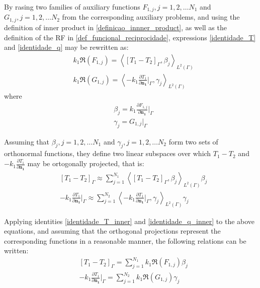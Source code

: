\documentclass[12pt]{CHT-20}
\begin{document}
By rasing two families of auxiliary functions $F_{1,j}, j=1,2,\ldots N_1$ and $G_{1,j}, j=1,2,\ldots N_2$ from the corresponding auxiliary problems, and using the definition of inner product in \eqref{definicao_innner_product}, as well as the definition of the RF in \eqref{def_funcional_reciprocidade}, expressions \eqref{identidade_T} and \eqref{identidade_q} may be rewritten as:
\begin{align}
& k_1 \Re(F_{1,j})
=
\left\langle \left[T_1 - T_2\right]_\Gamma, \beta_j\right\rangle _{L^2(\Gamma)}
\label{identidade_T_inner} \\
& k_1 \Re(G_{1,j})
=
\left\langle  -k_1 \frac{\partial T_1}{\partial\mathbf{n_1}}\bigg|_\Gamma, \gamma_j\right\rangle _{L^2(\Gamma)}
\label{identidade_q_inner}
\end{align}
where
\begin{align}
& \beta_j = k_1 \frac{\partial F_{1,j}}{\partial\mathbf{n_1}}\bigg|_\Gamma \label{expressao_define_beta} \\
& \gamma_j = G_{1,j}\big|_\Gamma \label{expressao_define_gamma}
\end{align}

Assuming that $\beta_j, j=1,2,\ldots N_1$ and $\gamma_j, j=1,2,\ldots N_2$ form two sets of orthonormal functions, they define two linear subspaces over which $T_1 - T_2$ and $-k_1 \frac{\partial T_1}{\partial\mathbf{n_1}}$ may be ortogonally projected, that is:
\begin{align}
& [T_1 - T_2]_\Gamma \approx \sum_{j=1}^{N_1} \left\langle  \left[T_1 - T_2\right]_\Gamma, \beta_j \right\rangle_{L^2(\Gamma)} \beta_j \\ 
& - k_1 \frac{\partial T_1}{\partial\mathbf{n_1}}\bigg|_\Gamma \approx \sum_{j=1}^{N_2} \left\langle  -k_1 \frac{\partial T_1}{\partial\mathbf{n_1}}\bigg|_\Gamma, \gamma_j \right\rangle_{L^2(\Gamma)} \gamma_j
\end{align}

Applying identities \eqref{identidade_T_inner} and \eqref{identidade_q_inner} to the above equations, and assuming that the orthogonal projections represent the corresponding functions in a reasonable manner, the following relations can be written:
\begin{align}
& [T_1 - T_2]_\Gamma = \sum_{j=1}^{N_1} k_1 \Re(F_{1,j}) \beta_j \label{resultado_1} \\
& - k_1 \frac{\partial T_1}{\partial\mathbf{n_1}}\bigg|_\Gamma = \sum_{j=1}^{N_2} k_1 \Re(G_{1,j}) \gamma_j \label{resultado_2}
\end{align}
\end{document}
